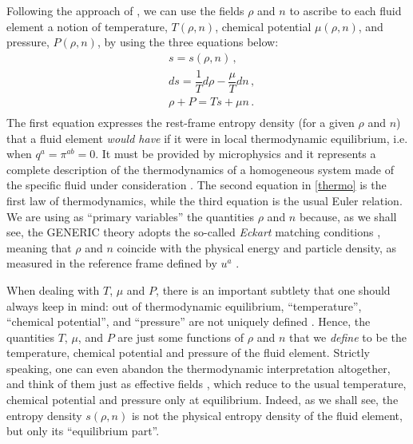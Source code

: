 \documentclass[a4paper, amsfonts, amssymb, amsmath, reprint, showkeys, nofootinbib, twoside, onecolumn, notitlepage]{revtex4-1}
\theoremstyle{definition}
\theoremstyle{theorem}
\begin{document}
Following the approach of \citet{Israel_Stewart_1979}, we can use the fields $\rho$ and $n$ to ascribe to each fluid element a notion of temperature, $T(\rho,n)$, chemical potential $\mu(\rho,n)$, and pressure, $P(\rho,n)$, by using the three equations below:
\begin{equation}\label{thermo}
\begin{split}
& s=s(\rho,n) \, , \\
& ds= \dfrac{1}{T} d\rho -\dfrac{\mu}{T} dn \, , \\
& \rho+P=Ts+\mu n \, . \\
\end{split}
\end{equation}
The first equation expresses the rest-frame entropy density (for a given $\rho$ and $n$) that a fluid element \textit{would have} if it were in local thermodynamic equilibrium, i.e. when $q^a=\pi^{ab}=0$. It must be provided by microphysics and it represents a complete description of the thermodynamics of a homogeneous system made of the specific fluid under consideration \citep{Callen_book,peliti_book}. The second equation in \eqref{thermo} is the first law of thermodynamics, while the third equation is the usual Euler relation. We are using as ``primary variables'' the quantities $\rho$ and $n$ because, as we shall see, the GENERIC theory adopts the so-called \emph{Eckart} matching conditions \cite{Bemfica2019_conformal1}, meaning that $\rho$ and $n$ coincide with the physical energy and particle density, as measured in the reference frame defined by $u^a$ \cite{Israel_Stewart_1979}. 

When dealing with $T$, $\mu$ and $P$, there is an important subtlety that one should always keep in mind: out of thermodynamic equilibrium, ``temperature'', ``chemical potential'', and ``pressure'' are not uniquely defined \cite{BulkGavassino}. Hence, the quantities $T$, $\mu$, and $P$ are just some functions of $\rho$ and $n$ that we \textit{define} to be the temperature, chemical potential and pressure of the fluid element. 
Strictly speaking, one can even abandon the thermodynamic interpretation altogether, and think of them just as effective fields \cite{Kovtun2019,BemficaDNDefinitivo2020,
DoreTorrieri2022}, which reduce to the usual temperature, chemical potential and pressure only at equilibrium. Indeed, as we shall see, the entropy density $s(\rho,n)$ is not the physical entropy density of the fluid element, but only its ``equilibrium part''.
\end{document}
